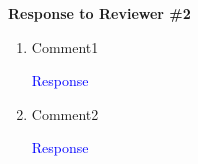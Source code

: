 \begin{center}
{\LARGE \textbf{Response to Reviewer \#2} \par}
\end{center}


\begin{enumerate}
  \item Comment1

  \textcolor{blue}{Response}
  \item Comment2

  \textcolor{blue}{Response}
\end{enumerate}